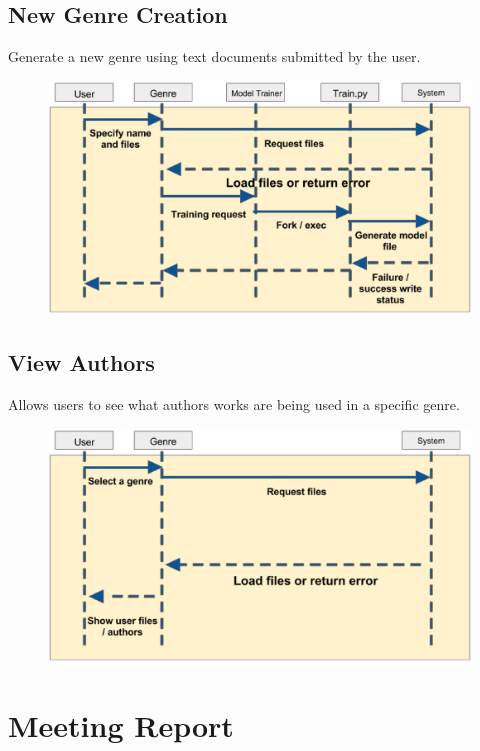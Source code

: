 \documentclass[12pt]{article}
\begin{document}
\newpage

\subsection{New Genre Creation}
Generate a new genre using text documents submitted by the user.
\begin{figure}[ht]
  \centering
    \includegraphics[scale=0.5]{Case2.eps}
\end{figure}

\newpage 

\subsection{View Authors}
Allows users to see what authors works are being used in a specific genre.
\begin{figure}[ht]
  \centering
    \includegraphics[scale=0.5]{Case3.eps}
\end{figure}

\newpage

\section{Meeting Report}
\end{document}

